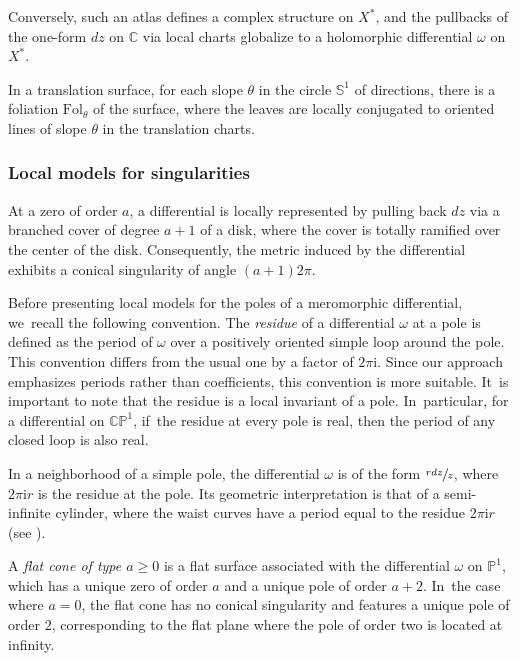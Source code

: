 \documentclass[11pt]{article}
\newcommand\PP{{\mathbb P}}
\theoremstyle{definition}
\begin{document}
Conversely, such an atlas defines a complex structure on $X^{\ast}$, and the pullbacks of the one-form $dz$ on $\mathbb{C}$ via local charts globalize to a holomorphic differential $\omega$ on $X^{\ast}$.

In a translation surface, for each slope $\theta$ in the circle $\mathbb{S}^{1}$ of directions, there is a foliation $\mathrm{Fol}_{\theta}$ of the surface, where the leaves are locally conjugated to oriented lines of slope $\theta$ in the translation charts.

\subsubsection{Local models for singularities}

At a zero of order $a$, a differential is locally represented by pulling back $dz$ via a branched cover of degree $a+1$ of a disk, where the cover is totally ramified over the center of the disk. Consequently, the metric induced by the differential exhibits a conical singularity of angle $(a+1)2\pi$.

Before presenting local models for the poles of a meromorphic differential, we~recall the following convention. The \textit{residue} of a differential $\omega$ at a pole is defined as the period of $\omega$ over a positively oriented simple loop around the pole. This convention differs from the usual one by a factor of $2\pi \mathrm{i}$. Since our approach emphasizes periods rather than coefficients, this convention is more suitable. It~is important to note that the residue is a local invariant of a pole. In~particular, for a differential on $\mathbb{CP}^{1}$, if~the residue at every pole is real, then the period of any closed loop is also real.

In a neighborhood of a simple pole, the differential $\omega$ is of the form $\sfrac{rdz}{z}$, where $2\pi \mathrm{i} r$ is the residue at the pole. Its geometric interpretation is that of a semi-infinite cylinder, where the waist curves have a period equal to the residue $2\pi \mathrm{i} r$ (see \cite[\S2.2]{Bo}).

A {\em flat cone of type $a\geq0$} is a flat surface associated with the differential $\omega$ on $\PP^{1}$, which has a unique zero of order $a$ and a unique pole of order $a+2$. In~the case where $a=0$, the flat cone has no conical singularity and features a unique pole of order $2$, corresponding to the flat plane where the pole of order two is located at infinity.
\end{document}
